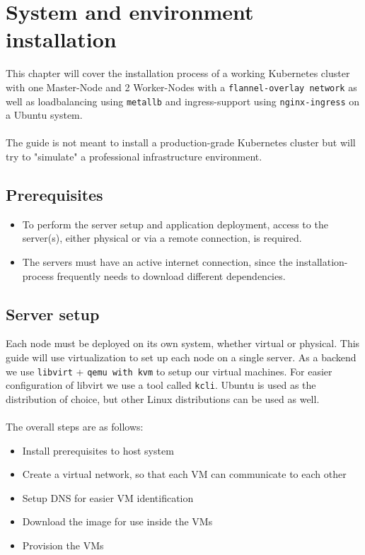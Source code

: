 \chapter{System and environment installation}

This chapter will cover the installation process of a working Kubernetes cluster with one Master-Node and 2 Worker-Nodes with a \texttt{flannel-overlay network} as well as loadbalancing using \texttt{metallb} and ingress-support using \texttt{nginx-ingress} on a Ubuntu system.\\\\The guide is not meant to install a production-grade Kubernetes cluster but will try to "simulate" a professional infrastructure environment.

\section{Prerequisites}
 \begin{itemize}
     \item To perform the server setup and application deployment, access to the server(s), either physical or via a remote connection, is required.
     \item The servers must have an active internet connection, since the installation-process frequently needs to download different dependencies.
 \end{itemize}
\section{Server setup}
Each node must be deployed on its own system, whether virtual or physical. This guide will use virtualization to set up each node on a single server. As a backend we use \texttt{libvirt} + \texttt{qemu with kvm} to setup our virtual machines. For easier configuration of libvirt we use a tool called \texttt{kcli}. Ubuntu is used as the distribution of choice, but other Linux distributions can be used as well.\\\\\noindent The overall steps are as follows:
\begin{itemize}
	\item Install prerequisites to host system
	\item Create a virtual network, so that each VM can communicate to each other
	\item Setup DNS for easier VM identification
	\item Download the image for use inside the VMs
	\item Provision the VMs
\end{itemize}


